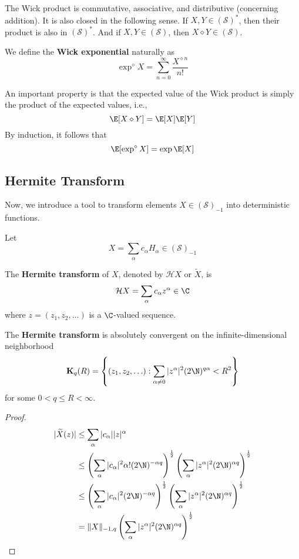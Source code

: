 %
%
%

The Wick product is commutative, associative, and distributive (concerning addition). It is also closed in the following sense. If $X, Y \in (\mathcal{S})^\ast$, then their product is also in $(\mathcal{S})^\ast$. And if $X, Y \in (\mathcal{S})$, then $X \diamond Y \in (\mathcal{S})$.

We define the \textbf{Wick exponential} naturally as
\[
\exp^\diamond X = \sum_{n=0}^\infty \frac{X^{\diamond n}}{n!}
\]

An important property is that the expected value of the Wick product is simply the product of the expected values, i.e., \[ \E [X \diamond Y] = \E[X] \E[Y] \] By induction, it follows that 
\[
\E [\exp^\diamond X] = \exp \E [X]
\]

\subsection*{Hermite Transform}

Now, we introduce a tool to transform elements $X \in (\mathcal{S})_{-1}$ into deterministic functions.

\begin{definition}
Let
\[
X = \sum_\alpha c_\alpha H_\alpha \in (\mathcal{S})_{-1}
\]

The \textbf{Hermite transform} of $X$, denoted by $\mathcal{H}X$ or $\widetilde{X}$, is
\[
\mathcal{H}X = \sum_\alpha c_\alpha z^\alpha \in \C
\]
where $z = (z_1, z_2, \ldots)$ is a $\C$-valued sequence.
\end{definition}

\begin{theorem}
The \textbf{Hermite transform} is absolutely convergent on the infinite-dimensional neighborhood
\[
\mathbf{K}_q(R) = \left\{ (z_1, z_2, \ldots) : \sum_{\alpha \neq 0} |z^\alpha|^2 (2\N)^{q\alpha} < R^2 \right\}
\]
for some $0 < q \leq R < \infty$.
\end{theorem}

\begin{proof}
\begin{equation*}
\begin{aligned}
|\widetilde{X}(z)| &\leq \sum_\alpha |c_\alpha| |z|^\alpha \\
&\leq \left(\sum_\alpha |c_\alpha|^2 \alpha! (2\N)^{-\alpha q} \right)^{\frac{1}{2}} \left(\sum_\alpha |z^\alpha|^2 (2\N)^{\alpha q} \right)^{\frac{1}{2}} \\
&\leq \left(\sum_\alpha |c_\alpha|^2 (2\N)^{-\alpha q} \right)^{\frac{1}{2}} \left(\sum_\alpha |z^\alpha|^2 (2\N)^{\alpha q} \right)^{\frac{1}{2}} \\
&= \| X \|_{-1, q} \left(\sum_\alpha |z^\alpha|^2 (2\N)^{\alpha q} \right)^{\frac{1}{2}}
\end{aligned}
\end{equation*}
\end{proof}

